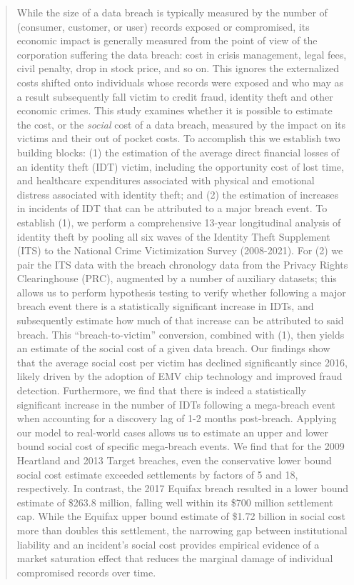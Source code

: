 \documentclass[acmsmall, screen, nonacm]{acmart}
\newcommand{\rev}[1]{{\color{blue}#1}}
\newcommand{\rev}[1]{#1}
\begin{document}
\begin{abstract}
While the size of a data breach is typically measured by the number of (consumer, customer, or user) records exposed or compromised, its economic impact is generally measured from the point of view of the corporation suffering the data breach: cost in crisis management, legal fees, civil penalty, drop in stock price, and so on. This ignores the externalized costs shifted onto individuals whose records were exposed and who may as a result subsequently fall victim to credit fraud, identity theft and other economic crimes.  This study examines whether it is possible to estimate the \rev{{\em true}} cost, or the {\em social} cost of a data breach, measured by the impact on its victims and their out of pocket costs. To accomplish this we establish two building blocks: (1) the estimation of the average direct financial losses of an identity theft (IDT) victim, including the opportunity cost of lost time, and healthcare expenditures associated with physical and emotional distress associated with identity theft; and (2) the estimation of increases in incidents of IDT that can be attributed to a major breach event. To establish (1), we perform a comprehensive 13-year longitudinal analysis of identity theft by pooling all six waves of the Identity Theft Supplement (ITS) to the National Crime Victimization Survey (2008-2021). For (2) we pair the ITS data with the  breach chronology data from the Privacy Rights Clearinghouse (PRC), augmented by a number of auxiliary datasets; this allows us to perform hypothesis testing to verify whether following a major breach event there is a statistically significant increase in IDTs, and subsequently estimate how much of that increase can be attributed to said breach. This ``breach-to-victim'' conversion, combined with (1), then yields an estimate of the social cost of a given data breach.  Our findings show that the average social cost per victim has declined significantly since 2016, likely driven by the adoption of EMV chip technology and improved fraud detection. Furthermore, we find that there is indeed a statistically significant increase in the number of IDTs following a mega-breach event when accounting for a discovery lag of 1-2 months post-breach. Applying our model to real-world cases allows us to estimate an upper and lower bound social cost of specific mega-breach events. We find that for the 2009 Heartland and 2013 Target breaches, even the conservative lower bound social cost estimate exceeded settlements by factors of 5 and 18, respectively. In contrast, the 2017 Equifax breach resulted in a lower bound estimate of \$263.8 million, falling well within its \$700 million settlement cap. While the Equifax upper bound estimate of \$1.72 billion in social cost more than doubles this settlement, the narrowing gap between institutional liability and an incident's social cost provides empirical evidence of a market saturation effect that reduces the marginal damage of individual compromised records over time.




\end{abstract}
\end{document}
